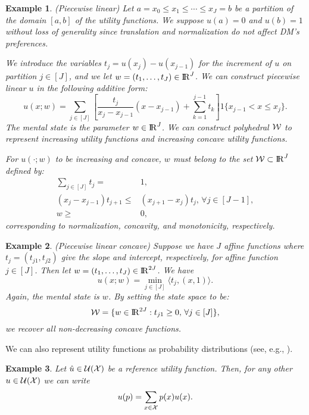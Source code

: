 \documentclass[11pt,oneside]{article}
\theoremstyle{plain}
\theoremstyle{plain}
\newtheorem{example}{Example}[section]
\theoremstyle{plain}
\theoremstyle{plain}
\theoremstyle{plain}
\theoremstyle{definition}
\theoremstyle{definition}
\theoremstyle{remark}
\theoremstyle{plain}
\newcommand{\R}{{\rm I\!R}}
\begin{document}
\begin{example}
(Piecewise linear) Let $a = x_0 \leq x_1 \leq \cdots \leq x_J = b$ be a partition of the domain $[a, b]$ of the utility functions.
We suppose $u(a) = 0$ and $u(b) = 1$ without loss of generality since translation and normalization do not affect DM's preferences.

We introduce the variables $t_j = u(x_j) - u(x_{j-1})$ for the increment of $u$ on partition $j \in [J]$, and we let $w = (t_1, \ldots, t_J) \in \R^J$.
We can construct piecewise linear $u$ in the following additive form:
%
\begin{equation}
\label{eq:sum_utility}
u(x; w) = \sum_{j \in [J]} \left[ \frac{t_j}{x_j - x_{j-1}}(x - x_{j-1}) + \sum_{k=1}^{j-1} t_k \right] 1\{x_{j-1} < x \leq x_j\}.
\end{equation}
%
The mental state is the parameter $w \in \R^J$. We can construct polyhedral ${\cal W}$ to represent increasing utility functions and increasing concave utility functions.

For $u(\cdot; w)$ to be increasing and concave, $w$ must belong to the set ${\cal W} \subset \R^J$ defined by:
%
\begin{align*}
    \sum_{j \in [J]} t_j = & 1,\\
    (x_j - x_{j-1})t_{j+1} \leq & (x_{j+1} - x_{j}) t_j,\, \forall j \in [J-1],\\
    w \geq & 0,
\end{align*}
%
corresponding to normalization, concavity, and  monotonicity, respectively.
\end{example}

\begin{example}
(Piecewise linear concave) Suppose we have $J$ affine functions where $t_j = (t_{j1}, t_{j2})$ give the slope and intercept, respectively, for affine function $j \in [J]$.
Then let $w = (t_1, \ldots, t_J) \in \R^{2 J}$.
We have
%
\begin{equation}
\label{eq:min_utility}
u(x; w) = \min_{j \in [J]} \langle t_j, (x, 1) \rangle.
\end{equation}
%
Again, the mental state is $w$. By setting the state space to be:
$$
{\cal W} = \{w \in \R^{2 J} : t_{j1} \geq 0,\, \forall j \in [J]\},
$$
we recover all non-decreasing concave functions.
\end{example}

We can also represent utility functions as probability distributions (see, e.g., \cite{hu2012robust}).

\begin{example}
Let $\hat{u} \in {\cal U}({\cal X})$ be a reference utility function.
Then, for any other $u \in {\cal U}({\cal X})$ we can write
$$
u(p) = \sum_{x \in {\cal X}} p(x) u(x).
$$
\end{example}
\end{document}
